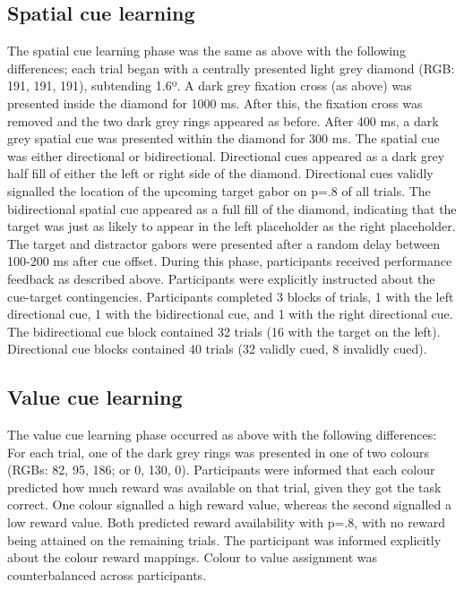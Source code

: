 \documentclass[11pt,halfline,a4paper,]{ouparticle}
\begin{document}
\hypertarget{spatial-cue-learning}{%
\subsection{Spatial cue learning}\label{spatial-cue-learning}}

The spatial cue learning phase was the same as above with the following differences; each trial began with a centrally presented light grey diamond (RGB: 191, 191, 191), subtending 1.6º. A dark grey fixation cross (as above) was presented inside the diamond for 1000 ms. After this, the fixation cross was removed and the two dark grey rings appeared as before. After 400 ms, a dark grey spatial cue was presented within the diamond for 300 ms. The spatial cue was either directional or bidirectional. Directional cues appeared as a dark grey half fill of either the left or right side of the diamond. Directional cues validly signalled the location of the upcoming target gabor on p=.8 of all trials. The bidirectional spatial cue appeared as a full fill of the diamond, indicating that the target was just as likely to appear in the left placeholder as the right placeholder. The target and distractor gabors were presented after a random delay between 100-200 ms after cue offset. During this phase, participants received performance feedback as described above. Participants were explicitly instructed about the cue-target contingencies. Participants completed 3 blocks of trials, 1 with the left directional cue, 1 with the bidirectional cue, and 1 with the right directional cue. The bidirectional cue block contained 32 trials (16 with the target on the left). Directional cue blocks contained 40 trials (32 validly cued, 8 invalidly cued).

\hypertarget{value-cue-learning}{%
\subsection{Value cue learning}\label{value-cue-learning}}

The value cue learning phase occurred as above with the following differences: For each trial, one of the dark grey rings was presented in one of two colours (RGBs: 82, 95, 186; or 0, 130, 0). Participants were informed that each colour predicted how much reward was available on that trial, given they got the task correct. One colour signalled a high reward value, whereas the second signalled a low reward value. Both predicted reward availability with p=.8, with no reward being attained on the remaining trials. The participant was informed explicitly about the colour reward mappings. Colour to value assignment was counterbalanced across participants.
\end{document}
